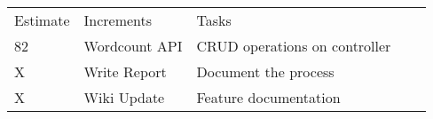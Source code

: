 \begin{table}[]
\begin{tabular}{|l|l|l|ll}
\cline{1-3}
Estimate & Increments                         & Tasks                         &  &  \\ \cline{1-3}
82       & \multicolumn{1}{c|}{Wordcount API} & CRUD operations on controller &  &  \\ \cline{1-3}
X        & Write Report                       & Document the process          &  &  \\ \cline{1-3}
X        & Wiki Update                        & Feature documentation         &  &  \\ \cline{1-3}
\end{tabular}
\end{table}





